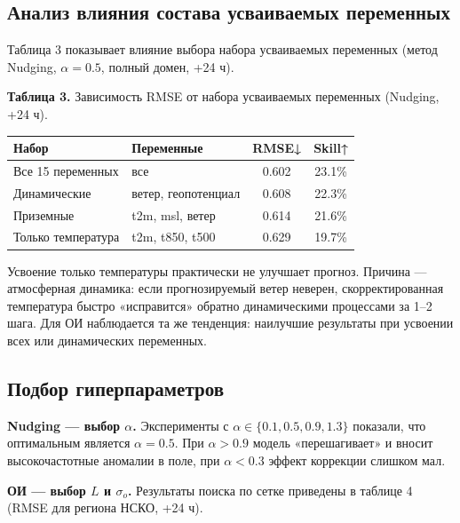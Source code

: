 \documentclass[14pt,a4paper]{extarticle}
\newcounter{none}
\numberwithin{table}{section}
\numberwithin{figure}{section}
\numberwithin{equation}{section}
\begin{document}
\subsection{Анализ влияния состава усваиваемых переменных}\label{ux430ux43dux430ux43bux438ux437-ux432ux43bux438ux44fux43dux438ux44f-ux441ux43eux441ux442ux430ux432ux430-ux443ux441ux432ux430ux438ux432ux430ux435ux43cux44bux445-ux43fux435ux440ux435ux43cux435ux43dux43dux44bux445}

Таблица 3 показывает влияние выбора набора усваиваемых переменных (метод
Nudging, \(\alpha=0.5\), полный домен, +24 ч).

\textbf{Таблица 3.} Зависимость RMSE от набора усваиваемых переменных
(Nudging, +24 ч).

{\def\LTcaptype{none} %
\begin{longtable}[]{@{}llcc@{}}
\toprule\noalign{}
Набор & Переменные & RMSE↓ & Skill↑ \\
\midrule\noalign{}
\endhead
\bottomrule\noalign{}
\endlastfoot
Все 15 переменных & все & 0.602 & 23.1\% \\
Динамические & ветер, геопотенциал & 0.608 & 22.3\% \\
Приземные & t2m, msl, ветер & 0.614 & 21.6\% \\
Только температура & t2m, t850, t500 & 0.629 & 19.7\% \\
\end{longtable}
}

Усвоение только температуры практически не улучшает прогноз. Причина ---
атмосферная динамика: если прогнозируемый ветер неверен,
скорректированная температура быстро «исправится» обратно динамическими
процессами за 1--2 шага. Для ОИ наблюдается та же тенденция: наилучшие
результаты при усвоении всех или динамических переменных.

\subsection{Подбор гиперпараметров}\label{ux43fux43eux434ux431ux43eux440-ux433ux438ux43fux435ux440ux43fux430ux440ux430ux43cux435ux442ux440ux43eux432}

\textbf{Nudging --- выбор \(\alpha\).} Эксперименты с
\(\alpha \in \{0.1, 0.5, 0.9, 1.3\}\) показали, что оптимальным является
\(\alpha = 0.5\). При \(\alpha > 0.9\) модель «перешагивает» и вносит
высокочастотные аномалии в поле, при \(\alpha < 0.3\) эффект коррекции
слишком мал.

\textbf{ОИ --- выбор \(L\) и \(\sigma_o\).} Результаты поиска по сетке
приведены в таблице 4 (RMSE для региона НСКО, +24 ч).
\end{document}
